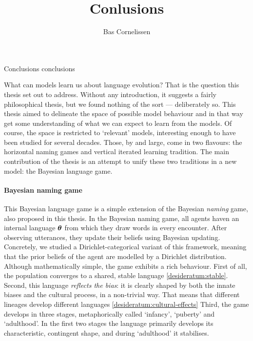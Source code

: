 \documentclass{../src/bcthesispart}
\title{Conlusions}
\author{Bas Cornelissen}
\begin{document}
%
	{Conclusions}%
	{conclusions}%
	{}


\noindent
What can models learn us about language evolution? 
That is the question this thesis set out to address.
Without any introduction, it suggests a fairly philosophical thesis, but we found nothing of the sort — deliberately so.
This thesis aimed to delineate the space of possible model behaviour and in that way get some understanding of what we can expect to learn from the models.
Of course, the space is restricted to ‘relevant’ models, interesting enough to have been studied for several decades.
Those, by and large, come in two flavours: the horizontal naming games and vertical iterated learning tradition. 
The main contribution of the thesis is an attempt to unify these two traditions in a new model: the Bayesian language game.





\paragraph{Bayesian naming game}
This Bayesian language game is a simple extension of the Bayesian \emph{naming} game, also proposed in this thesis.
In the Bayesian naming game, all agents haven an internal language $\boldsymbol{\mathbf{\theta}}$ from which they draw words in every encounter.
After observing utterances, they update their beliefs using Bayesian updating.
Concretely, we studied a Dirichlet-categorical variant of this framework, meaning that the prior beliefs of the agent are modelled by a Dirichlet distribution.
Although mathematically simple, the game exhibits a rich behaviour.
First of all, the population converges to a shared, stable language \ref{desideratum:stable}. 
Second, this language \emph{reflects the bias}: it is clearly shaped by both the innate biases and the cultural process, in a non-trivial way. 
That means that different lineages develop different languages \ref{desideratum:cultural-effects}
Third, the game develops in three stages, metaphorically called ‘infancy’, ‘puberty’ and ‘adulthood’. 
In the first two stages the language primarily develops its characteristic, contingent shape, and during ‘adulthood’ it stabilises.
\end{document}
